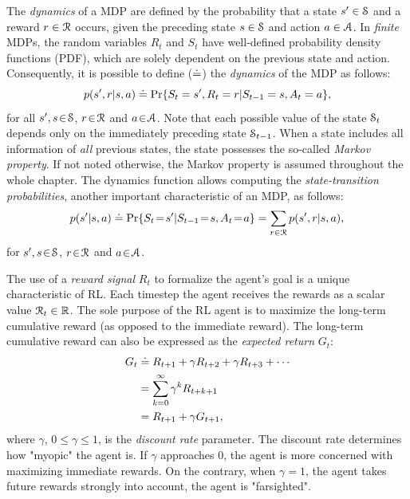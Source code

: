 \documentclass[a4paper, 12pt]{article}
\begin{document}
The \emph{dynamics} of a MDP are defined by the probability that a state \(s'\in \S\)
and a reward \(r\in\R\) occurs, given the preceding state \(s\in\S\) and action
\(a\in\A\). In \emph{finite} MDPs, the random variables \(R_t\) and \(S_t\) have
well-defined probability density functions (PDF), which are solely dependent on
the previous state and action. Consequently, it is possible to define (\(\defeq\))
the \emph{dynamics} of the MDP as follows:
\begin{equation}
    p(s',r|s,a) \defeq \Pr{S_t=s',R_t=r|S_{t-1}=s,A_t=a},
\end{equation}
for all \(s',s\!\in\!\S\), \(r\!\in\!\R\) and \(a\!\in\!\A\). Note that each possible
value of the state \(\S_t\) depends only on the immediately preceding state
\(\S_{t-1}\). When a state includes all information of \emph{all} previous states, the
state possesses the so-called \emph{Markov property}. If not noted otherwise, the
Markov property is assumed throughout the whole chapter. The dynamics function
allows computing the \emph{state-transition probabilities}, another important
characteristic of an MDP, as follows:
\begin{equation}
    p(s'|s,a) \defeq \Pr{S_t\!=\!s'|S_{t-1}\!=\!s,A_t\!=\!a} = \sum_{r\in\R}{p(s', r|s, a)},
\end{equation}
for \(s',s\!\in\!\S\), \(r\!\in\!\R\) and \(a\!\in\!\A\).

The use of a \emph{reward signal} \(R_t\) to formalize the agent's goal is a unique
characteristic of RL. Each timestep the agent receives the rewards as a scalar
value \(\R_t\in\Re\). The sole purpose of the RL agent is to maximize the
long-term cumulative reward (as opposed to the immediate reward). The long-term
cumulative reward can also be expressed as the \emph{expected return} \(G_t\):
\begin{equation} \label{eq-expected-return}
\begin{split}
    G_t &\defeq R_{t+1} + \gamma R_{t+2} + \gamma R_{t+3} + \cdots \\
    &= \sum_{k=0}^{\infty}{\gamma^k R_{t+k+1}} \\
    &= R_{t+1} + \gamma G_{t+1},
\end{split}
\end{equation}
where \(\gamma\), \(0\leq\gamma\leq 1\), is the \emph{discount rate} parameter. The
discount rate determines how "myopic" the agent is. If \(\gamma\) approaches 0,
the agent is more concerned with maximizing immediate rewards. On the contrary,
when \(\gamma\!=\! 1\), the agent takes future rewards strongly into account, the
agent is "farsighted".
\end{document}

